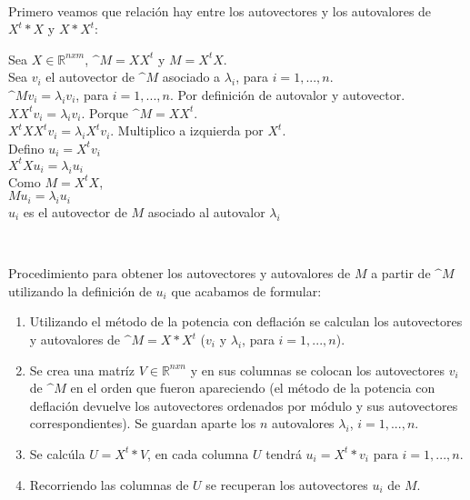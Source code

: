 \\
Primero veamos que relación hay entre los autovectores y los autovalores de {$X^t*X$ y $X*X^t$}:\\
\begin{center}
Sea $X\in\mathbb{R}^{nxm}$, $\^{M}=XX^t$ y $M=X^tX$.\\
Sea $v_i$ el autovector de $\^{M}$ asociado a $\lambda_i$, para  $i = 1, ..., n$.\\
\Rightarrow $\^{M}v_i=\lambda_iv_i$, para  $i = 1, ..., n$. Por definición de autovalor y autovector.\\
\Rightarrow $XX^tv_i=\lambda_iv_i$. Porque $\^{M}=XX^t$. \\
\Rightarrow $X^tXX^tv_i=\lambda_iX^tv_i$. Multiplico a izquierda por $X^t$.\\
 Defino $u_i=X^tv_i$\\
\Rightarrow $X^tXu_i=\lambda_iu_i$\\
Como $M=X^tX$,\\
\Rightarrow$Mu_i = \lambda_iu_i$\\
\therefore $u_i$ es el autovector de $M$ asociado al autovalor $\lambda_i$
\end{center}\\
\bigskip

Procedimiento para obtener los autovectores y autovalores de $M$ a partir de  $\^{M}$ utilizando la definición de $u_i$ que acabamos de formular:
\begin{enumerate}
\item Utilizando el método de la potencia con deflación se calculan los autovectores y autovalores de $\^{M}=X*X^t$ ($v_i$ y $\lambda_i$, para  $i = 1, ..., n$). 
\item Se crea una matríz $V\in\mathbb{R}^{nxn}$ y en sus columnas se colocan los autovectores $v_i$ de $\^{M}$ en el orden que fueron apareciendo (el método de la potencia con deflación devuelve los autovectores ordenados por módulo y sus autovectores correspondientes). Se guardan aparte los $n$ autovalores $\lambda_i$,  $i = 1, ..., n$.
\item Se calcúla $U=X^t*V$, en cada columna $U$ tendrá $u_i = X^t*v_i$ para $i = 1, ..., n$.
\item Recorriendo las columnas de $U$ se recuperan los autovectores $u_i$ de $M$.

\end{enumerate}\tabularnewline


